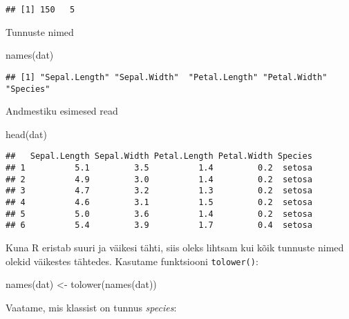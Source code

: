 \documentclass[
]{book}
\newenvironment{Shaded}{\begin{snugshade}}{\end{snugshade}}
\newcommand{\FunctionTok}[1]{\textcolor[rgb]{0.00,0.00,0.00}{#1}}
\newcommand{\NormalTok}[1]{#1}
\newcommand{\OtherTok}[1]{\textcolor[rgb]{0.56,0.35,0.01}{#1}}
\newcommand{\SpecialCharTok}[1]{\textcolor[rgb]{0.00,0.00,0.00}{#1}}
\begin{document}
\begin{verbatim}
## [1] 150   5
\end{verbatim}

Tunnuste nimed

\begin{Shaded}
\begin{Highlighting}[]
\FunctionTok{names}\NormalTok{(dat)}
\end{Highlighting}
\end{Shaded}

\begin{verbatim}
## [1] "Sepal.Length" "Sepal.Width"  "Petal.Length" "Petal.Width"  "Species"
\end{verbatim}

Andmestiku esimesed read

\begin{Shaded}
\begin{Highlighting}[]
\FunctionTok{head}\NormalTok{(dat)}
\end{Highlighting}
\end{Shaded}

\begin{verbatim}
##   Sepal.Length Sepal.Width Petal.Length Petal.Width Species
## 1          5.1         3.5          1.4         0.2  setosa
## 2          4.9         3.0          1.4         0.2  setosa
## 3          4.7         3.2          1.3         0.2  setosa
## 4          4.6         3.1          1.5         0.2  setosa
## 5          5.0         3.6          1.4         0.2  setosa
## 6          5.4         3.9          1.7         0.4  setosa
\end{verbatim}

Kuna R eristab suuri ja väikesi tähti, siis oleks lihtsam kui kõik tunnuste nimed olekid väikestes tähtedes. Kasutame funktsiooni \texttt{tolower()}:

\begin{Shaded}
\begin{Highlighting}[]
\FunctionTok{names}\NormalTok{(dat) }\OtherTok{\textless{}{-}} \FunctionTok{tolower}\NormalTok{(}\FunctionTok{names}\NormalTok{(dat))}
\end{Highlighting}
\end{Shaded}

Vaatame, mis klassist on tunnus \emph{species}:

\begin{Shaded}
\end{Shaded}
\end{document}
